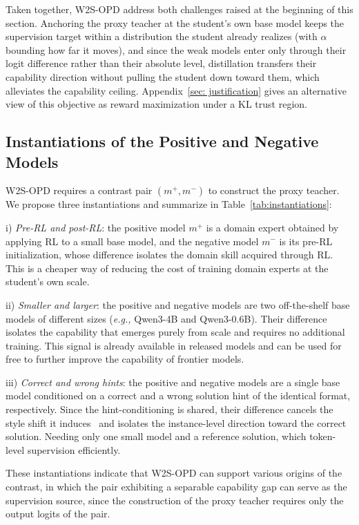 \documentclass{article}
\newcommand{\eg}{\textit{e.g., }}
\newcommand\ours{W2S-OPD\xspace}
\begin{document}
Taken together, \ours address both challenges raised at the beginning of this section. Anchoring the proxy teacher at the student's own base model keeps the supervision target within a distribution the student already realizes (with $\alpha$ bounding how far it moves), and since the weak models enter only through their logit difference rather than their absolute level, distillation transfers their capability direction without pulling the student down toward them, which alleviates the capability ceiling. Appendix~\ref{sec: justification} gives an alternative view of this objective as reward maximization under a KL trust region.

\subsection{Instantiations of the Positive and Negative Models}
\label{sec:instantiation}
\ours requires a contrast pair $(m^{+}, m^{-})$ to construct the proxy teacher. We propose three instantiations and summarize in Table~\ref{tab:instantiations}:

i) \textit{Pre-RL and post-RL}: the positive model $m^{+}$ is a domain expert obtained by applying RL to a small base model, and the negative model $m^{-}$ is its pre-RL initialization, whose difference isolates the domain skill acquired through RL. This is a cheaper way of reducing the cost of training domain experts at the student's own scale.

ii) \textit{Smaller and larger}: the positive and negative models are two
off-the-shelf base models of different sizes (\eg Qwen3-4B and Qwen3-0.6B). Their difference isolates the capability that emerges purely from scale and requires no additional training. This signal is already available in released models and can be used for free to further improve the capability of frontier models.

iii) \textit{Correct and wrong hints}: the positive and negative models are a single base model conditioned on a correct and a wrong solution hint of the identical format, respectively. Since the hint-conditioning is shared, their difference cancels the style shift it induces~\citep{pan2026rlcsd} and isolates the instance-level direction toward the correct solution. Needing only one small model and a reference solution, which token-level supervision efficiently.

These instantiations indicate that \ours can support various origins of the contrast, in which the pair exhibiting a separable capability gap can serve as the supervision source, since the construction of the proxy teacher requires only the output logits of the pair.
\end{document}
